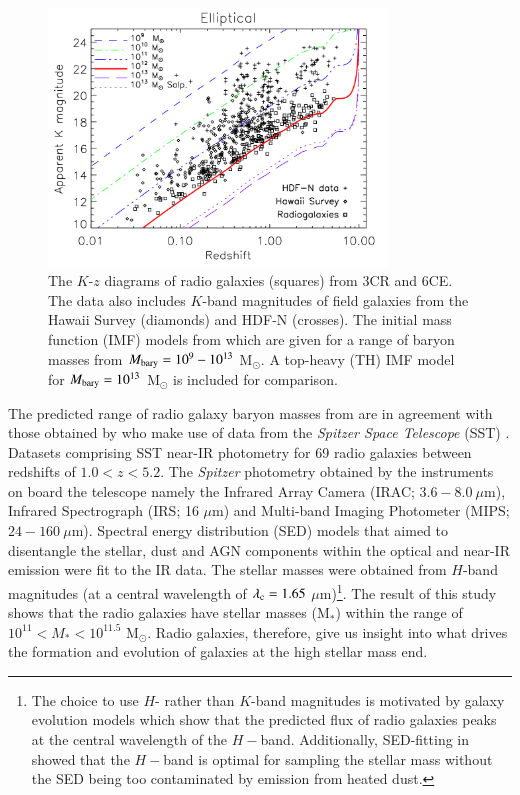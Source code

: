\begin{figure}[!ht]
  \centering
  \includegraphics[width=0.8\textwidth]{plots_chp1/K_z_Rocca-Volmerange_2004_pegase.png}
  \caption[$K$-$z$ diagram for elliptical radio galaxies from \citet{rocca-volmerange2004}]{The $K$-$z$ diagrams of radio galaxies (squares) from 3CR and 6CE. The data also includes $K$-band magnitudes of field galaxies from the Hawaii Survey \citep{Songaila1994} (diamonds) and HDF-N \citep[Hubble Deep Field-North;][]{Dickinson2003} (crosses). The initial mass function (IMF) models from \citet{RanaBasu1992} which are given for a range of baryon masses from $M_{\rm bary} = 10^9 - 10^{13}$ M$_\odot.$ A top-heavy (TH) IMF model for $M_{\rm bary} = 10^{13}$ M$_\odot$ is included for comparison.}
  \label{fig:K-z-rocca-volmerange2004-pegase}
\end{figure}

The predicted range of radio galaxy baryon masses from \citet{rocca-volmerange2004} are in agreement with those obtained by \citet{seymour2007} who make use of data from the {\it Spitzer Space Telescope} (SST) \citep{Werner2004}. Datasets comprising SST near-IR photometry for 69 radio galaxies between redshifts of $1.0 < z < 5.2.$ The {\it Spitzer} photometry obtained by the instruments on board the telescope namely the Infrared Array Camera (IRAC; $3.6-8.0~\mu$m), Infrared Spectrograph (IRS; 16 $\mu$m) and Multi-band Imaging Photometer (MIPS; $24-160~\mu$m). Spectral energy distribution (SED) models that aimed to disentangle the stellar, dust and AGN components within the optical and near-IR emission were fit to the IR data. The stellar masses were obtained from $H$-band magnitudes (at a central wavelength of $\lambda_{\rm c} = 1.65$ $\mu$m)\footnote{The choice to use $H$- rather than $K$-band magnitudes is motivated by galaxy evolution models which show that the predicted flux of radio galaxies peaks at the central wavelength of the $H-$band. Additionally, SED-fitting in \citet{Drouart2012} showed that the $H-$band is optimal for sampling the stellar mass without the SED being too contaminated by emission from heated dust.}. The result of this study shows that the radio galaxies have stellar masses (M$_*$) within the range of $10^{11} < M_* < 10^{11.5}$ M$_\odot.$  Radio galaxies, therefore, give us insight into what drives the formation and evolution of galaxies at the high stellar mass end.

